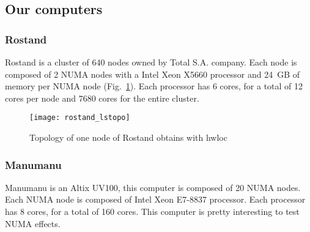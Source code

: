 \subsection{Our computers}


\subsubsection{Rostand}
Rostand is a cluster of 640 nodes owned by Total S.A. company.
%
Each node is composed of 2 NUMA nodes with a Intel Xeon X5660 processor and 24~GB of memory per NUMA node (Fig.~\ref{fig:rostand}).
%
Each processor has 6 cores, for a total of 12 cores per node and 7680 cores for the entire cluster.

\begin{figure}[!ht]
        \centering
        \texttt{[image: rostand\_lstopo]}
        \caption{Topology of one node of Rostand obtains with hwloc}
        \label{fig:rostand}
\end{figure}

\subsubsection{Manumanu}
Manumanu is an Altix UV100, this computer is composed of 20 NUMA nodes.
%
Each NUMA node is composed of Intel Xeon E7-8837 processor.
%
Each processor has 8 cores, for a total of 160 cores.
%
This computer is pretty interesting to test NUMA effects.
